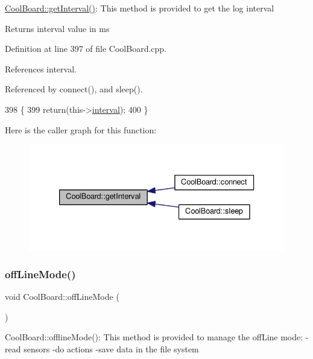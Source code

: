 \hyperlink{classCoolBoard_a31cf73a70425114cd7ee49c6e5244199}{Cool\+Board\+::get\+Interval()}\+: This method is provided to get the log interval \begin{DoxyReturn}{Returns}
interval value in ms 
\end{DoxyReturn}


Definition at line 397 of file Cool\+Board.\+cpp.



References interval.



Referenced by connect(), and sleep().


\begin{DoxyCode}
398 \{
399     \textcolor{keywordflow}{return}(this->\hyperlink{classCoolBoard_a6d5c2603e162dcd6e7626a5b90f30837}{interval});
400 \}
\end{DoxyCode}
Here is the caller graph for this function\+:
\nopagebreak
\begin{figure}[H]
\begin{center}
\leavevmode
\includegraphics[width=333pt]{classCoolBoard_a31cf73a70425114cd7ee49c6e5244199_icgraph}
\end{center}
\end{figure}
\mbox{\label{classCoolBoard_ae6b5e1274d760462290192acea4adca8}} 
\subsubsection{\texorpdfstring{off\+Line\+Mode()}{offLineMode()}}
{\footnotesize\ttfamily void Cool\+Board\+::off\+Line\+Mode (\begin{DoxyParamCaption}{ }\end{DoxyParamCaption})}

Cool\+Board\+::offline\+Mode()\+: This method is provided to manage the off\+Line mode\+: -\/read sensors -\/do actions -\/save data in the file system 

